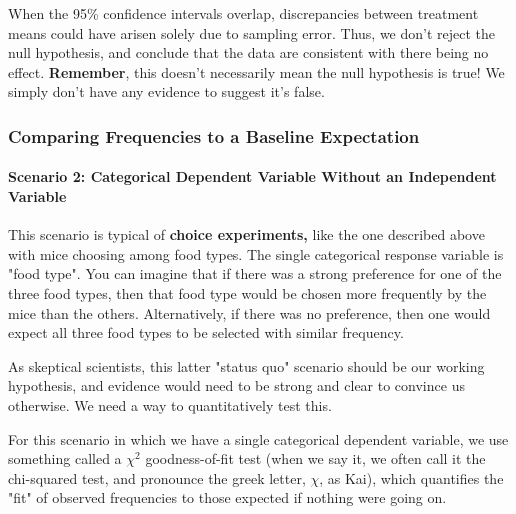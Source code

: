 \documentclass[
]{book}
\begin{document}
When the 95\% confidence intervals overlap, discrepancies between treatment means could have arisen solely due to sampling error. Thus, we don't reject the null hypothesis, and conclude that the data are consistent with there being no effect. \textbf{Remember}, this doesn't necessarily mean the null hypothesis is true! We simply don't have any evidence to suggest it's false.

\hypertarget{comparing-frequencies-to-a-baseline-expectation}{%
\subsubsection*{Comparing Frequencies to a Baseline Expectation}\label{comparing-frequencies-to-a-baseline-expectation}}

\hypertarget{scenario-2-categorical-dependent-variable-without-an-independent-variable}{%
\paragraph*{Scenario 2: Categorical Dependent Variable Without an Independent Variable}\label{scenario-2-categorical-dependent-variable-without-an-independent-variable}}

This scenario is typical of \textbf{choice experiments,} like the one described above with mice choosing among food types. The single categorical response variable is "food type". You can imagine that if there was a strong preference for one of the three food types, then that food type would be chosen more frequently by the mice than the others. Alternatively, if there was no preference, then one would expect all three food types to be selected with similar frequency.

As skeptical scientists, this latter "status quo" scenario should be our working hypothesis, and evidence would need to be strong and clear to convince us otherwise. We need a way to quantitatively test this.

For this scenario in which we have a single categorical dependent variable, we use something called a \(\chi{^2}\) goodness-of-fit test (when we say it, we often call it the chi-squared test, and pronounce the greek letter, \(\chi\), as Kai), which quantifies the "fit" of observed frequencies to those expected if nothing were going on.
\end{document}
